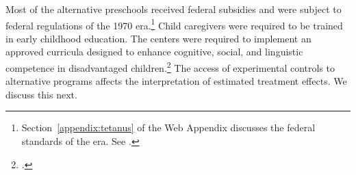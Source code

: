 Most of the alternative preschools received federal subsidies and were subject to federal regulations of the 1970 era.\footnote{Section~\ref{appendix:tetanus} of the Web Appendix discusses the federal standards of the era. See \citet{Department-of-Health_1968_DayCareRequirements,NCGA_1971_House-Bill-100,Ramey-et-al_1977_Intro-to-ABC,Ramey_Campbell_1979_SR,Ramey_McGinness_etal_1982_Abecedarianapproach, Burchinal_Campbell_etal_1997_CD}.} Child caregivers were required to be trained in early childhood education. The centers were required to implement an approved curricula designed to enhance cognitive, social, and linguistic competence in disadvantaged children.\footnote{\citet{Burchinal_etal_1989_CD_Daycare-Pre-K-Dev}.} The access of experimental controls to alternative programs affects the interpretation of estimated treatment effects. We discuss this next.

